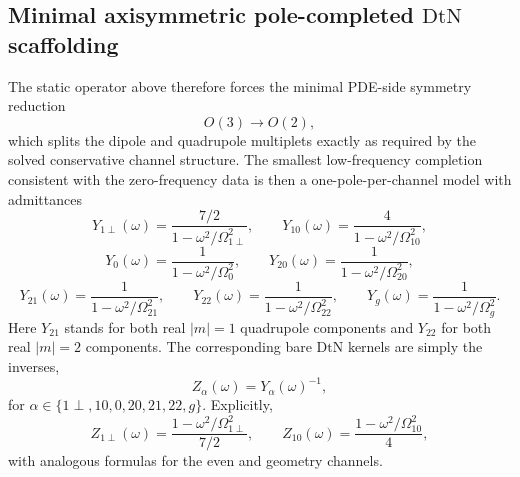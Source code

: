 \documentclass[11pt]{article}
\newcommand{\DtN}{\mathrm{DtN}}
\begin{document}
\subsection{Minimal axisymmetric pole-completed \texorpdfstring{$\DtN$}{DtN} scaffolding}
\label{app:irred-dtn-axisymmetric}

The static operator above therefore forces the minimal PDE-side symmetry reduction
\begin{equation}
O(3)\longrightarrow O(2),
\label{eq:irred-dtn-O3O2}
\end{equation}
which splits the dipole and quadrupole multiplets exactly as required by the solved
conservative channel structure.
The smallest low-frequency completion consistent with the zero-frequency data is then a
one-pole-per-channel model with admittances
\begin{equation}
Y_{1\perp}(\omega)=\frac{7/2}{1-\omega^2/\Omega_{1\perp}^2},
\qquad
Y_{10}(\omega)=\frac{4}{1-\omega^2/\Omega_{10}^2},
\label{eq:irred-dtn-Yodd}
\end{equation}
\begin{equation}
Y_0(\omega)=\frac{1}{1-\omega^2/\Omega_0^2},
\qquad
Y_{20}(\omega)=\frac{1}{1-\omega^2/\Omega_{20}^2},
\label{eq:irred-dtn-Y0Y20}
\end{equation}
\begin{equation}
Y_{21}(\omega)=\frac{1}{1-\omega^2/\Omega_{21}^2},
\qquad
Y_{22}(\omega)=\frac{1}{1-\omega^2/\Omega_{22}^2},
\qquad
Y_g(\omega)=\frac{1}{1-\omega^2/\Omega_g^2}.
\label{eq:irred-dtn-Y21Y22Yg}
\end{equation}
Here \(Y_{21}\) stands for both real \(|m|=1\) quadrupole components and
\(Y_{22}\) for both real \(|m|=2\) components.  The corresponding bare \(\DtN\) kernels are
simply the inverses,
\begin{equation}
Z_{\alpha}(\omega)=Y_{\alpha}(\omega)^{-1},
\label{eq:irred-dtn-Zinverse}
\end{equation}
for \(\alpha\in\{1\perp,10,0,20,21,22,g\}\).  Explicitly,
\begin{equation}
Z_{1\perp}(\omega)=\frac{1-\omega^2/\Omega_{1\perp}^2}{7/2},
\qquad
Z_{10}(\omega)=\frac{1-\omega^2/\Omega_{10}^2}{4},
\label{eq:irred-dtn-Zodd}
\end{equation}
with analogous formulas for the even and geometry channels.
\end{document}
